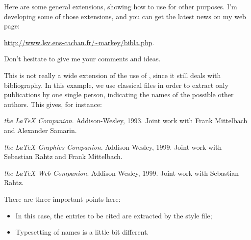 %
% 
% 


\label{autres}
\parttoc
\mtcskip

Here are some general extensions, showing how to use \bt for other purposes.
I'm developing some of those extensions, and you can get the latest news on my web
page: 
\begin{center}
\url{http://www.lsv.ens-cachan.fr/~markey/bibla.php}.
\end{center}
Don't hesitate to give me your comments and ideas.


This is not really a wide extension of the use of \bt, since it still deals
with bibliography. In this example, we use classical  files in order
to extract only publications by one single person, indicating the names of the
possible other authors. This gives, for instance:
\begin{myex}
\def\refname{Books by Michel \textsc{Goossens}}
\begin{thebibliography}{9}
{\em the \LaTeX{} Companion}.
Addison-Wesley, 1993.
Joint work with Frank Mittelbach  and  Alexander Samarin. 

{\em the \LaTeX{} Graphics Companion}.
Addison-Wesley, 1999.
Joint work with  Sebastian Rahtz and Frank Mittelbach.

{\em the \LaTeX{} Web Companion}.
Addison-Wesley, 1999.
Joint work with Sebastian Rahtz.

\end{thebibliography}
\end{myex}

There are three important points here:
\begin{itemize}
\item In this case, the entries to be cited are extracted by the style file;
\item Typesetting of names is a little bit different.
\end{itemize}

